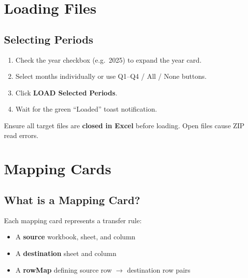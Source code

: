 \documentclass[11pt,a4paper]{article}
\begin{document}
\section{Loading Files}

\subsection{Selecting Periods}

\begin{stepbox}
\begin{enumerate}[leftmargin=*, itemsep=6pt]
\item Check the year checkbox (e.g.\ 2025) to expand the year card.
\item Select months individually or use Q1--Q4 / All / None buttons.
\item Click \textbf{LOAD Selected Periods}.
\item Wait for the green ``Loaded'' toast notification.
\end{enumerate}
\end{stepbox}

\begin{warningbox}[Important]
Ensure all target files are \textbf{closed in Excel} before loading. Open files cause ZIP read errors.
\end{warningbox}

\section{Mapping Cards}

\subsection{What is a Mapping Card?}

Each mapping card represents a transfer rule:

\begin{itemize}[leftmargin=*, itemsep=2pt]
\item A \textbf{source} workbook, sheet, and column
\item A \textbf{destination} sheet and column
\item A \textbf{rowMap} defining source row $\rightarrow$ destination row pairs
\end{itemize}
\end{document}
